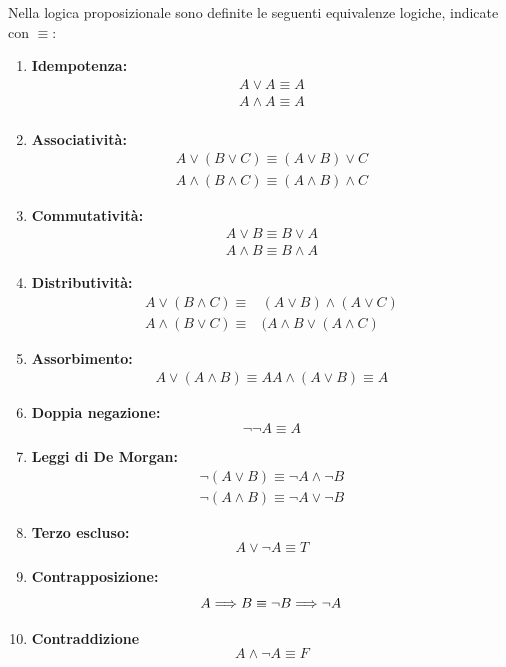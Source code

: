 \documentclass[a4paper,12pt, oneside]{book}
\begin{document}
Nella logica proposizionale sono definite le seguenti equivalenze logiche,
indicate con $\equiv$: 
\begin{enumerate}
  \item \textbf{Idempotenza:}
  \begin{align*}
    A \lor A  \equiv  A \\
    A \land A  \equiv  A \\
  \end{align*}
  \item \textbf{Associatività:}
  \begin{align*}
    A \lor (B \lor C) \equiv  (A \lor B) \lor C \\
    A \land (B \land C)  \equiv  (A \land B) \land C
  \end{align*}
  \item \textbf{Commutatività:}
  \begin{align*}
    A \lor B  \equiv  B \lor A \\
    A \land B  \equiv  B \land A
  \end{align*}
  \item \textbf{Distributività:}
  \begin{align*}
    A \lor (B \land C)  \equiv & (A \lor B) \land (A \lor C)\\
    A \land (B \lor C)  \equiv & (A \land B \lor (A \land C)
  \end{align*}
  \item \textbf{Assorbimento:}
  \begin{align*}
    A \lor (A \land B)  \equiv  A
    A \land (A \lor B)  \equiv  A
  \end{align*}
  \item \textbf{Doppia negazione:}
  \begin{equation*}
    \neg \neg A \equiv A
  \end{equation*}
  \item\textbf{Leggi di De Morgan:}
  \begin{align*}
    \neg (A \lor B)  \equiv  \neg A \land \neg B \\
    \neg(A \land B)  \equiv  \neg A \lor \neg B
  \end{align*}
  \item \textbf{Terzo escluso:}
  \begin{equation*}
    A \lor \neg A \equiv T
  \end{equation*}
  \item \textbf{Contrapposizione:}
  \begin{equation*}
    A {\implies} B \equiv \neg B {\implies} \neg A
  \end{equation*}
  \item \textbf{Contraddizione}
  \begin{equation*}
    A \land \neg A \equiv F
  \end{equation*}
\end{enumerate}
\end{document}
